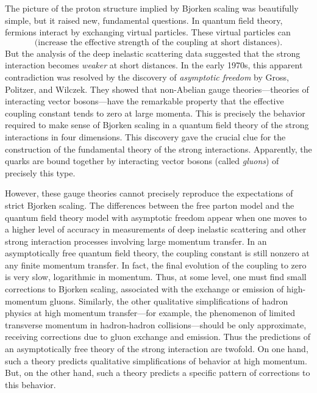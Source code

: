 The picture of the proton structure implied by Bjorken scaling was
beautifully simple, but it raised new, fundamental questions.  In quantum
field theory, fermions interact by exchanging virtual particles.  These
virtual particles can
\begin{equation}
  \text{(increase the effective strength of the coupling at short
    distances)} .
\end{equation}
But the analysis of the deep inelastic scattering data suggested that the
strong interaction becomes \emph{weaker} at short distances.  In the early
1970s, this apparent contradiction was resolved by the discovery of
\emph{asymptotic freedom} by Gross, Politzer, and Wilczek.  They showed that
non-Abelian gauge theories---theories of interacting vector bosons---have the
remarkable property that the effective coupling constant tends to zero at
large momenta.  This is precisely the behavior required to make sense of
Bjorken scaling in a quantum field theory of the strong interactions in four
dimensions.  This discovery gave the crucial clue for the construction of the
fundamental theory of the strong interactions.  Apparently, the quarks are
bound together by interacting vector bosons (called \emph{gluons}) of
precisely this type.

However, these gauge theories cannot precisely reproduce the expectations of
strict Bjorken scaling.  The differences between the free parton model and
the quantum field theory model with asymptotic freedom appear when one moves
to a higher level of accuracy in measurements of deep inelastic scattering
and other strong interaction processes involving large momentum transfer.  In
an asymptotically free quantum field theory, the coupling constant is still
nonzero at any finite momentum transfer.  In fact, the final evolution of the
coupling to zero is very slow, logarithmic in momentum.  Thus, at some level,
one must find small corrections to Bjorken scaling, associated with the
exchange or emission of high-momentum gluons.  Similarly, the other
qualitative simplifications of hadron physics at high momentum transfer---for
example, the phenomenon of limited transverse momentum in hadron-hadron
collisions---should be only approximate, receiving corrections due to gluon
exchange and emission.  Thus the predictions of an asymptotically free theory
of the strong interaction are twofold.  On one hand, such a theory predicts
qualitative simplifications of behavior at high momentum.  But, on the other
hand, such a theory predicts a specific pattern of corrections to this
behavior.

